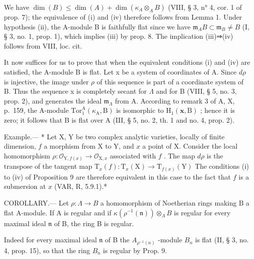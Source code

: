 We have \(\dim(B) \leqslant \dim(A) + \dim(\kappa_A \otimes_A B)\) (VIII, § 3, n° 4, cor. 1 of prop. 7); the equivalence of (i) and (iv) therefore follows from Lemma 1. Under hypothesis (ii), the A-module B is faithfully flat since we have \(\mathfrak{m}_A B \subset \mathfrak{m}_B \neq B\) (I, § 3, no. 1, prop. 1), which implies (iii) by prop. 8. The implication (iii)⇒(iv) follows from VIII, loc. cit.

It now suffices for us to prove that when the equivalent conditions (i) and (iv) are satisfied, the A-module B is flat. Let x be a system of coordinates of A. Since \(d\rho\) is injective, the image under \(\rho\) of this sequence is part of a coordinate system of B. Thus the sequence x is completely secant for \(\Lambda\) and for B (VIII, § 5, no. 3, prop. 2), and generates the ideal \(\mathfrak{m}_{\Lambda}\) from A. According to remark 3 of A, X, p.~159, the A-module \(\mathrm{Tor}_{1}^{\mathrm{A}}(\kappa_{\mathrm{A}},\mathrm{B})\) is isomorphic to \(\mathrm{H}_{1}(\mathbf{x},\mathrm{B})\) ; hence it is zero; it follows that B is flat over A (III, § 5, no. 2, th. 1 and no. 4, prop. 2).

Example.--- * Let X, Y be two complex analytic varieties, locally of finite dimension, \(f\) a morphism from X to Y, and \(x\) a point of X. Consider the local homomorphism \(\rho: \mathcal{O}_{\mathrm{Y}, f(x)} \to \mathcal{O}_{\mathrm{X}, x}\) associated with \(f\) . The map \(d\rho\) is the transpose of the tangent map \(\mathrm{T}_x(f): \mathrm{T}_x(\mathrm{X}) \to \mathrm{T}_{f(x)}(\mathrm{Y})\) The conditions (i) to (iv) of Proposition 9 are therefore equivalent in this case to the fact that \(f\) is a submersion at \(x\) (VAR, R, 5.9.1).*

COROLLARY.--- Let \(\rho: \Lambda \to B\) a homomorphism of Noetherian rings making B a flat A-module. If A is regular and if \(\kappa(\rho^{-1}(\mathfrak{n})) \otimes_{\Lambda} B\) is regular for every maximal ideal \(\mathfrak{n}\) of B, the ring B is regular.

Indeed for every maximal ideal \(\mathfrak{n}\) of B the \(A_{\rho^{-1}(n)}\) -module \(B_{n}\) is flat (II, § 3, no. 4, prop. 15), so that the ring \(B_{n}\) is regular by Prop. 9.

